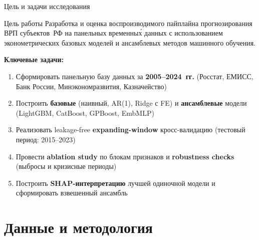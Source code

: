 \documentclass[aspectratio=169,10pt]{beamer}
\begin{document}
\begin{frame}{Цель и задачи исследования}
\begin{block}{Цель работы}
  Разработка и оценка воспроизводимого пайплайна прогнозирования ВРП
  субъектов~РФ на панельных временны\'{х} данных с использованием
  эконометрических базовых моделей и ансамблевых методов машинного обучения.
\end{block}
\vspace{0.25em}
\textbf{\color{hsedark}Ключевые задачи:}
\begin{enumerate}
  \item Сформировать панельную базу данных за \textbf{2005–2024~гг.}
        (Росстат, ЕМИСС, Банк России, Минэкономразвития, Казначейство)
  \item Построить \textbf{базовые} (наивный, AR(1), Ridge с FE) и
        \textbf{ансамблевые} модели (LightGBM, CatBoost, GPBoost, EmbMLP)
  \item Реализовать leakage-free \textbf{expanding-window} кросс-валидацию
        (тестовый период: 2015–2023)
  \item Провести \textbf{ablation study} по блокам признаков и
        \textbf{robustness checks} (выбросы и кризисные периоды)
  \item Построить \textbf{SHAP-интерпретацию} лучшей одиночной модели
        и сформировать взвешенный ансамбль
\end{enumerate}
\end{frame}

\section{Данные и методология}
\end{document}
